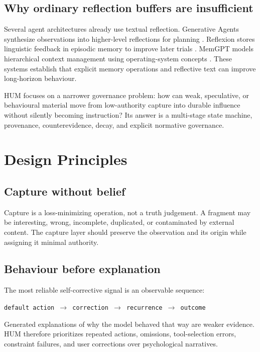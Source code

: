 \documentclass[11pt,a4paper]{article}
\begin{document}
\subsection{Why ordinary reflection buffers are insufficient}

Several agent architectures already use textual reflection. Generative Agents synthesize observations into higher-level reflections for planning \cite{park2023}. Reflexion stores linguistic feedback in episodic memory to improve later trials \cite{shinn2023}. MemGPT models hierarchical context management using operating-system concepts \cite{packer2023}. These systems establish that explicit memory operations and reflective text can improve long-horizon behaviour.

HUM focuses on a narrower governance problem: how can weak, speculative, or behavioural material move from low-authority capture into durable influence without silently becoming instruction? Its answer is a multi-stage state machine, provenance, counterevidence, decay, and explicit normative governance.

\section{Design Principles}

\subsection{Capture without belief}

Capture is a loss-minimizing operation, not a truth judgement. A fragment may be interesting, wrong, incomplete, duplicated, or contaminated by external content. The capture layer should preserve the observation and its origin while assigning it minimal authority.

\subsection{Behaviour before explanation}

The most reliable self-corrective signal is an observable sequence:

\begin{center}
\texttt{default action $\rightarrow$ correction $\rightarrow$ recurrence $\rightarrow$ outcome}
\end{center}

Generated explanations of why the model behaved that way are weaker evidence. HUM therefore prioritizes repeated actions, omissions, tool-selection errors, constraint failures, and user corrections over psychological narratives.
\end{document}
